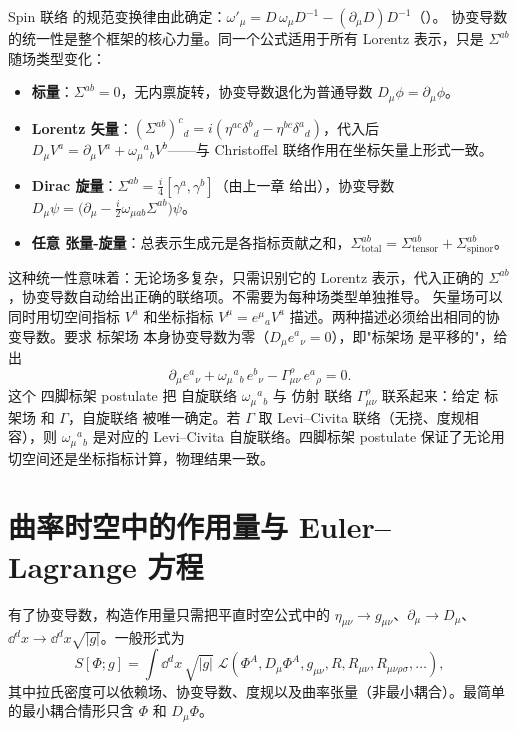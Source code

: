 Spin 联络 的规范变换律由此确定：$\omega'_\mu=D\,\omega_\mu D^{-1}-(\partial_\mu D)D^{-1}$（）。
协变导数 的统一性是整个框架的核心力量。同一个公式适用于所有 Lorentz 表示，只是 $\Sigma^{ab}$ 随场类型变化：

\begin{itemize}
\item \textbf{标量}：$\Sigma^{ab}=0$，无内禀旋转，协变导数退化为普通导数 $D_\mu\phi=\partial_\mu\phi$。
\item \textbf{Lorentz 矢量}：$(\Sigma^{ab})^c{}_d=i(\eta^{ac}\delta^b{}_d-\eta^{bc}\delta^a{}_d)$，代入后 $D_\mu V^a=\partial_\mu V^a+\omega_\mu{}^a{}_b V^b$——与 Christoffel 联络作用在坐标矢量上形式一致。
\item \textbf{Dirac 旋量}：$\Sigma^{ab}=\frac{i}{4}[\gamma^a,\gamma^b]$（由上一章 给出），协变导数 $D_\mu\psi=\big(\partial_\mu-\frac{i}{2}\omega_{\mu ab}\Sigma^{ab}\big)\psi$。
\item \textbf{任意 张量-旋量}：总表示生成元是各指标贡献之和，$\Sigma^{ab}_{\text{total}}=\Sigma^{ab}_{\text{tensor}}+\Sigma^{ab}_{\text{spinor}}$。
\end{itemize}

这种统一性意味着：无论场多复杂，只需识别它的 Lorentz 表示，代入正确的 $\Sigma^{ab}$，协变导数自动给出正确的联络项。不需要为每种场类型单独推导。
矢量场可以同时用切空间指标 $V^a$ 和坐标指标 $V^\mu=e^\mu{}_a V^a$ 描述。两种描述必须给出相同的协变导数。要求 标架场 本身协变导数为零（$D_\mu e^a{}_\nu=0$），即"标架场 是平移的"，给出
\begin{equation*}\boxed{
\partial_\mu e^a{}_\nu+\omega_\mu{}^a{}_b\,e^b{}_\nu-\Gamma^\rho_{\mu\nu}\,e^a{}_\rho=0.
}
\end{equation*}
这个 四脚标架 postulate 把 自旋联络 $\omega_\mu{}^a{}_b$ 与 仿射 联络 $\Gamma^\rho_{\mu\nu}$ 联系起来：给定 标架场 和 $\Gamma$，自旋联络 被唯一确定。若 $\Gamma$ 取 Levi--Civita 联络（无挠、度规相容），则 $\omega_\mu{}^a{}_b$ 是对应的 Levi--Civita 自旋联络。四脚标架 postulate 保证了无论用切空间还是坐标指标计算，物理结果一致。

\section{曲率时空中的作用量与 Euler--Lagrange 方程}

有了协变导数，构造作用量只需把平直时空公式中的 $\eta_{\mu\nu}\to g_{\mu\nu}$、$\partial_\mu\to D_\mu$、$\dd^dx\to \dd^dx\sqrt{|g|}$。一般形式为
\begin{equation}\label{eq:ms-curved-action}
\boxed{
S[\Phi;g]=\int \dd^dx\,\sqrt{|g|}\;\mathcal{L}(\Phi^A,D_\mu\Phi^A,g_{\mu\nu},R,R_{\mu\nu},R_{\mu\nu\rho\sigma},\ldots),
}
\end{equation}
其中拉氏密度可以依赖场、协变导数、度规以及曲率张量（非最小耦合）。最简单的最小耦合情形只含 $\Phi$ 和 $D_\mu\Phi$。

